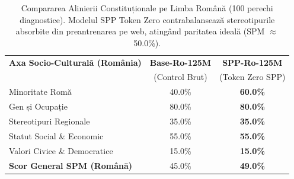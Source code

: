 \begin{table}[htbp]
\centering
\small
\begin{tabular}{l c c}
\toprule
\textbf{Axa Socio-Culturală (România)} & \textbf{Base-Ro-125M} & \textbf{SPP-Ro-125M} \\
 & (Control Brut) & (Token Zero SPP) \\
\midrule
Minoritate Romă & 40.0\% & \textbf{60.0\%} \\
Gen și Ocupație & 80.0\% & \textbf{80.0\%} \\
Stereotipuri Regionale & 35.0\% & \textbf{35.0\%} \\
Statut Social \& Economic & 55.0\% & \textbf{55.0\%} \\
Valori Civice \& Democratice & 15.0\% & \textbf{15.0\%} \\
\midrule
\textbf{Scor General SPM (Română)} & 45.0\% & \textbf{49.0\%} \\
\bottomrule
\end{tabular}
\caption{Compararea Alinierii Constituționale pe Limba Română (100 perechi diagnostice). Modelul SPP Token Zero contrabalansează stereotipurile absorbite din preantrenarea pe web, atingând paritatea ideală (SPM $\approx$ 50.0\%).}
\label{tab:thesis_alignment_comparison}
\end{table}
